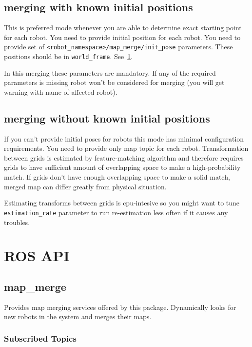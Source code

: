\subsection{merging with known initial positions}

This is preferred mode whenever you are able to determine exact starting point for each robot. You need to provide initial position for each robot. You need to provide set of \texttt{<robot\_namespace>/map\_merge/init\_pose} parameters. These positions should be in \texttt{world\_frame}. See~\ref{sec:rosapi}.

In this merging these parameters are mandatory. If any of the required parameters is missing robot won't be considered for merging (you will get warning with name of affected robot).

\subsection{merging without known initial positions}

If you can't provide initial poses for robots this mode has minimal configuration requirements. You need to provide only map topic for each robot. Transformation between grids is estimated by feature-matching algorithm and therefore requires grids to have sufficient amount of overlapping space to make a high-probability match. If grids don't have enough overlapping space to make a solid match, merged map can differ greatly from physical situation.

Estimating transforms between grids is cpu-intesive so you might want to tune \texttt{estimation\_rate} parameter to run re-estimation less often if it causes any troubles.

\section{ROS API}
\label{sec:rosapi}

\subsection{map\_merge}

Provides map merging services offered by this package. Dynamically looks for new robots in the system and merges their maps.

\subsubsection{Subscribed Topics}

